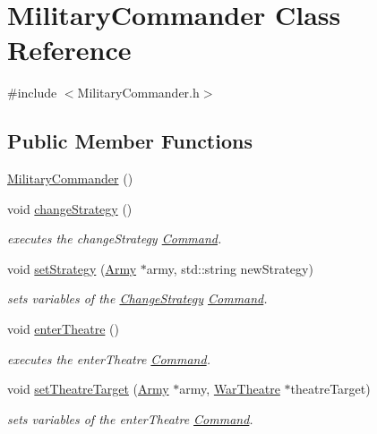 \hypertarget{class_military_commander}{}\section{Military\+Commander Class Reference}
\label{class_military_commander}


{\ttfamily \#include $<$Military\+Commander.\+h$>$}

\subsection*{Public Member Functions}
\begin{DoxyCompactItemize}
\item 
\mbox{\hyperlink{class_military_commander_aa787892a0f992455849804cf7ee939da}{Military\+Commander}} ()
\item 
void \mbox{\hyperlink{class_military_commander_a13eca5a78f356e36533cade003264a3c}{change\+Strategy}} ()
\begin{DoxyCompactList}\small\item\em executes the change\+Strategy \mbox{\hyperlink{class_command}{Command}}. \end{DoxyCompactList}\item 
void \mbox{\hyperlink{class_military_commander_ade59c82b3b5b429e7d0d53a352c03ec6}{set\+Strategy}} (\mbox{\hyperlink{class_army}{Army}} $\ast$army, std\+::string new\+Strategy)
\begin{DoxyCompactList}\small\item\em sets variables of the \mbox{\hyperlink{class_change_strategy}{Change\+Strategy}} \mbox{\hyperlink{class_command}{Command}}. \end{DoxyCompactList}\item 
void \mbox{\hyperlink{class_military_commander_a1a1a7520c843505e6111f78c291983f6}{enter\+Theatre}} ()
\begin{DoxyCompactList}\small\item\em executes the enter\+Theatre \mbox{\hyperlink{class_command}{Command}}. \end{DoxyCompactList}\item 
void \mbox{\hyperlink{class_military_commander_a061489dab4cb1f0255e901534daaa4a9}{set\+Theatre\+Target}} (\mbox{\hyperlink{class_army}{Army}} $\ast$army, \mbox{\hyperlink{class_war_theatre}{War\+Theatre}} $\ast$theatre\+Target)
\begin{DoxyCompactList}\small\item\em sets variables of the enter\+Theatre \mbox{\hyperlink{class_command}{Command}}. \end{DoxyCompactList}\item 

\end{DoxyCompactItemize}
